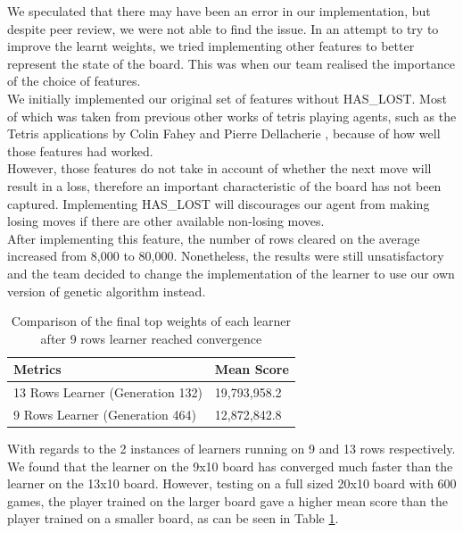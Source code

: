 \documentclass[a4paper,12pt,twocolumn]{article}
\begin{document}
We speculated that there may have been an error in our implementation, but despite
peer review, we were not able to find the issue. In an attempt to try to improve the
learnt weights, we tried implementing other features to better represent the state
of the board. This was when our team realised the importance of the choice of features.\\

We initially implemented our original set of features without HAS\_LOST. Most of which
was taken from previous other works of tetris playing agents, such as the Tetris
applications by Colin Fahey and Pierre Dellacherie \cite{colin_fahey}, because of
how well those features had worked.\\

However, those features do not take in account of whether the next move will result
in a loss, therefore an important characteristic of the board has not been captured.
Implementing HAS\_LOST will discourages our agent from making losing moves if
there are other available non-losing moves.\\

After implementing this feature, the number of rows cleared on the average increased
from 8,000 to 80,000. Nonetheless, the results were still unsatisfactory and the team
decided to change the implementation of the learner to use our own version of genetic
algorithm instead.\\

\begin{table}[h]
	\centering
	\begin{tabular}{|l|l|}
		\hline
		\textbf{Metrics}                 & \textbf{Mean Score} \\
		\hline
		13 Rows Learner (Generation 132) & 19,793,958.2        \\
		\hline
		9 Rows Learner (Generation 464)  & 12,872,842.8        \\
		\hline
	\end{tabular}
	\caption{
		Comparison of the final top weights of each learner after 9 rows learner
		reached convergence
	}
	\label{learner_comparison}
\end{table}

With regards to the 2 instances of learners running on 9 and 13 rows respectively.
We found that the learner on the 9x10 board has converged much faster than the
learner on the 13x10 board. However, testing on a full sized 20x10 board with 600 games,
the player trained on the larger board gave a higher mean score than the player
trained on a smaller board, as can be seen in Table \ref{learner_comparison}.\\
\end{document}
